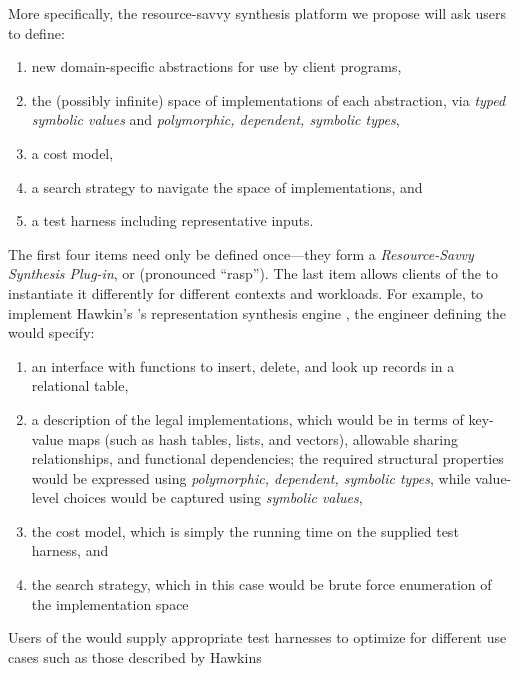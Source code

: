 


More specifically, the resource-savvy synthesis platform we propose will ask users to define:

\begin{enumerate}
\item new domain-specific abstractions for use by client programs,
\item the (possibly infinite) space of implementations of each abstraction,
via \emph{typed symbolic values} and \emph{polymorphic, dependent, symbolic types},
\item a cost model,
\item a search strategy to navigate the space of implementations, and
\item a test harness including representative inputs.
\end{enumerate}
%
The first four items need only be defined once---they form a
\emph{Resource-Savvy Synthesis Plug-in}, or \rasp{}  (pronounced ``rasp'').
The last item allows clients of the \rasp to instantiate it differently for
different contexts and workloads.
For example, to implement Hawkin's \etal's representation synthesis
engine \cite{data-rep-synth}, 
the engineer defining the \rasp{} would specify:

\begin{enumerate}
\item an interface with functions to insert, delete, and look up records in a relational table,
\item a description of the legal implementations, which would be in terms of key-value maps
(such as hash tables, lists, and vectors), allowable sharing
relationships, and functional dependencies; the required structural properties
would be expressed using \emph{polymorphic, dependent, symbolic types}, while
value-level choices would be captured using \emph{symbolic values},
\item the cost model, which is simply the running time on the supplied
  test harness, and
\item the search strategy, which in this case would be brute force enumeration of the implementation space
\end{enumerate}
%
Users of the \rasp{} would supply appropriate test harnesses to optimize for
different use cases such as those described by Hawkins \etal

